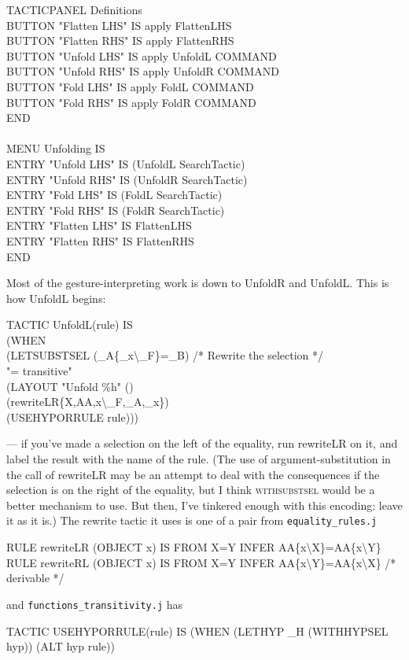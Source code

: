 \begin{japeish}
TACTICPANEL Definitions  \\
\tab BUTTON  "Flatten LHS"   IS apply FlattenLHS \\
\tab BUTTON  "Flatten RHS"   IS apply FlattenRHS \\
\tab BUTTON  "Unfold LHS"    IS apply UnfoldL COMMAND \\
\tab BUTTON  "Unfold RHS"    IS apply UnfoldR COMMAND \\
\tab BUTTON  "Fold LHS"  IS apply FoldL   COMMAND \\
\tab BUTTON  "Fold RHS"  IS apply FoldR   COMMAND  \\
END \\
\\
MENU Unfolding IS \\
\tab ENTRY "Unfold LHS"     IS (UnfoldL SearchTactic) \\
\tab ENTRY "Unfold RHS"     IS (UnfoldR SearchTactic) \\
\tab ENTRY "Fold LHS"       IS (FoldL SearchTactic) \\
\tab ENTRY "Fold RHS"       IS (FoldR SearchTactic) \\
\tab ENTRY "Flatten LHS"    IS FlattenLHS \\
\tab ENTRY "Flatten RHS"    IS FlattenRHS \\
END
\end{japeish}
Most of the gesture-interpreting work is down to UnfoldR and UnfoldL. This is how UnfoldL begins:
\begin{japeish}
TACTIC UnfoldL(rule) IS \\
\tab (WHEN  \\
\tab \tab (LETSUBSTSEL (\_A\{\_x{\textbackslash}\_F\}=\_B)       /* Rewrite the selection */ \\
\tab \tab \tab "= transitive"  \\
\tab \tab \tab (LAYOUT "Unfold \%h" ()  \\
\tab \tab \tab \tab (rewriteLR\{X,AA,x{\textbackslash}\_F,\_A,\_x\})  \\
\tab \tab \tab \tab (USEHYPORRULE rule)))
\end{japeish}
--- if you've made a selection on the left of the equality, run rewriteLR on it, and label the result with the name of the rule. (The use of argument-substitution in the call of rewriteLR may be an attempt to deal with the consequences if the selection is on the right of the equality, but I think \textsc{withsubstsel} would be a better mechanism to use. But then, I've tinkered enough with this encoding: leave it as it is.) The rewrite tactic it uses is one of a pair from \texttt{equality\_rules.j}
\begin{japeish}
RULE rewriteLR (OBJECT x) IS FROM X=Y INFER AA\{x{\textbackslash}X\}=AA\{x{\textbackslash}Y\} \\
RULE rewriteRL (OBJECT x) IS FROM X=Y INFER AA\{x{\textbackslash}Y\}=AA\{x{\textbackslash}X\} /* derivable */
\end{japeish}
and \texttt{functions\_transitivity.j} has
\begin{japeish}
TACTIC USEHYPORRULE(rule) IS (WHEN (LETHYP \_H (WITHHYPSEL hyp)) (ALT hyp rule))
\end{japeish}

